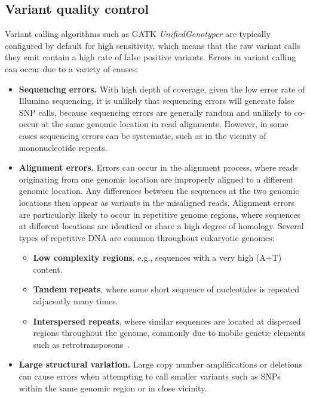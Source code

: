 \begin{refsection}
\subsection{Variant quality control}\label{subsec:variant-quality-control}


Variant calling algorithms such as GATK \textit{UnifiedGenotyper} are typically configured by default for high sensitivity, which means that the raw variant calls they emit contain a high rate of false positive variants.
%
Errors in variant calling can occur due to a variety of causes:
\begin{itemize}
%
\item \textbf{Sequencing errors.} With high depth of coverage, given the low error rate of Illumina sequencing, it is unlikely that sequencing errors will generate false SNP calls, because sequencing errors are generally random and unlikely to co-occur at the same genomic location in read alignments.
%
However, in some cases sequencing errors can be systematic, such as in the vicinity of mononucleotide repeats.
%
\item \textbf{Alignment errors.} Errors can occur in the alignment process, where reads originating from one genomic location are improperly aligned to a different genomic location.
%
Any differences between the sequences at the two genomic locations then appear as variants in the misaligned reads.
%
Alignment errors are particularly likely to occur in repetitive genome regions, where sequences at different locations are identical or share a high degree of homology.
%
Several types of repetitive DNA are common throughout eukaryotic genomes:
%
\begin{itemize}
%
\item \textbf{Low complexity regions}, e.g., sequences with a very high (A+T) content.
%
\item \textbf{Tandem repeats}, where some short sequence of nucleotides is repeated adjacently many times.
%
\item \textbf{Interspersed repeats}, where similar sequences are located at dispersed regions throughout the genome, commonly due to mobile genetic elements such as retrotransposons~\parencite{Tu2004,FernandezMedina2011}.
%
\end{itemize}
%
\item \textbf{Large structural variation.} Large copy number amplifications or deletions can cause errors when attempting to call smaller variants such as SNPs within the same genomic region or in close vicinity.

\end{itemize}
\end{refsection}
